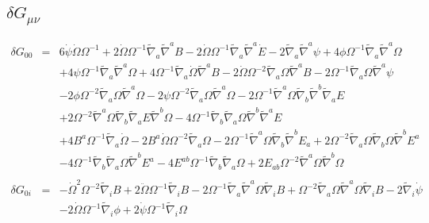 \documentclass[10pt,letterpaper]{article}
\numberwithin{equation}{section}
\begin{document}
\subsection{$\delta G_{\mu\nu}$}
\begin{eqnarray}
\delta G_{00} &=& 
6 \dot{\psi} \dot{\Omega} \Omega^{-1}
+ 2 \dot{\Omega} \Omega^{-1} \tilde{\nabla}_{a}\tilde{\nabla}^{a}B
- 2 \dot{\Omega} \Omega^{-1} \tilde{\nabla}_{a}\tilde{\nabla}^{a}\dot{E}
- 2 \tilde{\nabla}_{a}\tilde{\nabla}^{a}\psi
+ 4 \phi \Omega^{-1} \tilde{\nabla}_{a}\tilde{\nabla}^{a}\Omega\nonumber\\
&& + 4 \psi \Omega^{-1} \tilde{\nabla}_{a}\tilde{\nabla}^{a}\Omega
+ 4 \Omega^{-1} \tilde{\nabla}_{a}\dot{\Omega} \tilde{\nabla}^{a}B
- 2 \dot{\Omega} \Omega^{-2} \tilde{\nabla}_{a}\Omega \tilde{\nabla}^{a}B
- 2 \Omega^{-1} \tilde{\nabla}_{a}\Omega \tilde{\nabla}^{a}\psi\nonumber\\
&& - 2 \phi \Omega^{-2} \tilde{\nabla}_{a}\Omega \tilde{\nabla}^{a}\Omega
- 2 \psi \Omega^{-2} \tilde{\nabla}_{a}\Omega \tilde{\nabla}^{a}\Omega
- 2 \Omega^{-1} \tilde{\nabla}^{a}\Omega \tilde{\nabla}_{b}\tilde{\nabla}^{b}\tilde{\nabla}_{a}E\nonumber\\
&& + 2 \Omega^{-2} \tilde{\nabla}^{a}\Omega \tilde{\nabla}_{b}\tilde{\nabla}_{a}E \tilde{\nabla}^{b}\Omega
- 4 \Omega^{-1} \tilde{\nabla}_{b}\tilde{\nabla}_{a}\Omega \tilde{\nabla}^{b}\tilde{\nabla}^{a}E
\nonumber\\
&&+4 B^{a} \Omega^{-1} \tilde{\nabla}_{a}\dot{\Omega}
- 2 B^{a} \dot{\Omega} \Omega^{-2} \tilde{\nabla}_{a}\Omega
- 2 \Omega^{-1} \tilde{\nabla}^{a}\Omega \tilde{\nabla}_{b}\tilde{\nabla}^{b}E_{a}
+ 2 \Omega^{-2} \tilde{\nabla}_{a}\Omega \tilde{\nabla}_{b}\Omega \tilde{\nabla}^{b}E^{a}\nonumber\\
&& - 4 \Omega^{-1} \tilde{\nabla}_{b}\tilde{\nabla}_{a}\Omega \tilde{\nabla}^{b}E^{a}
-4 E^{ab} \Omega^{-1} \tilde{\nabla}_{b}\tilde{\nabla}_{a}\Omega
+ 2 E_{ab} \Omega^{-2} \tilde{\nabla}^{a}\Omega \tilde{\nabla}^{b}\Omega
%
%
\\ \nonumber\\
%
%
\delta G_{0i} &=&
- \dot{\Omega}^2 \Omega^{-2} \tilde{\nabla}_{i}B
+ 2 \ddot{\Omega} \Omega^{-1} \tilde{\nabla}_{i}B
- 2 \Omega^{-1} \tilde{\nabla}_{a}\tilde{\nabla}^{a}\Omega \tilde{\nabla}_{i}B
+ \Omega^{-2} \tilde{\nabla}_{a}\Omega \tilde{\nabla}^{a}\Omega \tilde{\nabla}_{i}B
- 2 \tilde{\nabla}_{i}\dot{\psi}\nonumber\\
&& - 2 \dot{\Omega} \Omega^{-1} \tilde{\nabla}_{i}\phi
+ 2 \dot{\psi} \Omega^{-1} \tilde{\nabla}_{i}\Omega

\end{eqnarray}
\end{document}
